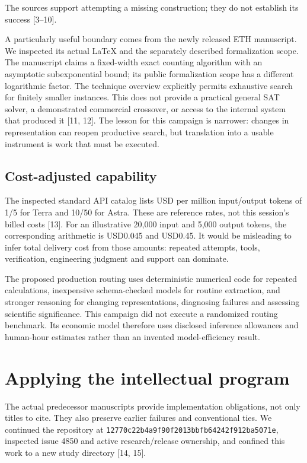 \documentclass[
  11pt,
]{article}
\begin{document}
The sources support attempting a missing construction; they do not
establish its success {[}3--10{]}.

A particularly useful boundary comes from the newly released ETH
manuscript. We inspected its actual LaTeX and the separately described
formalization scope. The manuscript claims a fixed-width exact counting
algorithm with an asymptotic subexponential bound; its public
formalization scope has a different logarithmic factor. The technique
overview explicitly permits exhaustive search for finitely smaller
instances. This does not provide a practical general SAT solver, a
demonstrated commercial crossover, or access to the internal system that
produced it {[}11, 12{]}. The lesson for this campaign is narrower:
changes in representation can reopen productive search, but translation
into a usable instrument is work that must be executed.

\hypertarget{cost-adjusted-capability}{%
\subsection{Cost-adjusted capability}\label{cost-adjusted-capability}}

The inspected standard API catalog lists USD per million input/output
tokens of 1/5 for Terra and 10/50 for Astra. These are reference rates,
not this session's billed costs {[}13{]}. For an illustrative 20,000
input and 5,000 output tokens, the corresponding arithmetic is USD0.045
and USD0.45. It would be misleading to infer total delivery cost from
those amounts: repeated attempts, tools, verification, engineering
judgment and support can dominate.

The proposed production routing uses deterministic numerical code for
repeated calculations, inexpensive schema-checked models for routine
extraction, and stronger reasoning for changing representations,
diagnosing failures and assessing scientific significance. This campaign
did not execute a randomized routing benchmark. Its economic model
therefore uses disclosed inference allowances and human-hour estimates
rather than an invented model-efficiency result.

\hypertarget{applying-the-intellectual-program}{%
\section{Applying the intellectual
program}\label{applying-the-intellectual-program}}

The actual predecessor manuscripts provide implementation obligations,
not only titles to cite. They also preserve earlier failures and
conventional ties. We continued the repository at
\texttt{12770c22b4a9f90f2013bbfb64242f912ba5071e}, inspected issue 4850
and active research/release ownership, and confined this work to a new
study directory {[}14, 15{]}.
\end{document}

